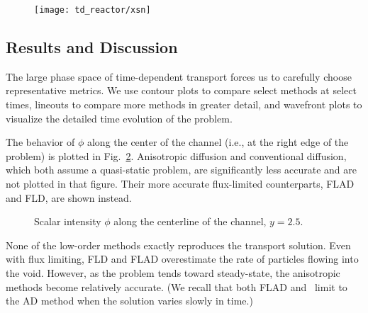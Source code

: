 \begin{figure}[tb]
  \centering
  \texttt{[image: td\_reactor/xsn]}
  \label{fig:tdReactorProblem}
\end{figure}

\subsection{Results and Discussion}

The large phase space of time-dependent transport forces us to carefully choose
representative metrics. We use contour plots to compare select methods at
select times, lineouts to compare more methods in greater detail, and wavefront
plots to visualize the detailed time evolution of the problem.

The behavior of $\phi$ along the center of the channel (i.e., at the
right edge of the problem) is plotted in Fig.~\ref{fig:tdReactor}. Anisotropic
diffusion and conventional diffusion, which both assume a quasi-static problem,
are significantly less accurate and are not plotted in that figure. Their
more accurate flux-limited counterparts, FLAD and FLD, are shown instead.

\begin{figure}[tb]
  \centering\small
  \subfloat[$t=2$]{%
    \hspace{-.25in}%
    }%
  \subfloat[$t=5$]{%
    \hspace{-.25in}%
    }

  \subfloat[$t=10$]{%
    \hspace{-.25in}%
    }%
  \subfloat[$t=15$]{%
    \hspace{-.25in}%
    }

  \caption{Scalar intensity $\phi$ along the centerline of the channel, $y=2.5$.}
  \label{fig:tdReactor}
\end{figure}

None of the low-order methods exactly reproduces the transport solution. Even
with flux
limiting, FLD and FLAD overestimate the rate of particles flowing into the void.
However, as the problem tends toward steady-state, the anisotropic
methods become relatively accurate. (We recall that both FLAD and \APone\ limit
to the AD method when the solution varies slowly in time.)

